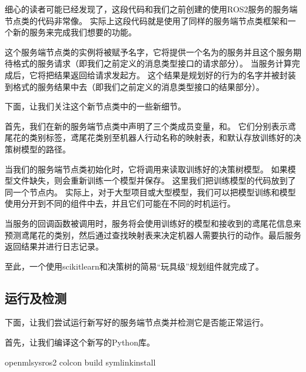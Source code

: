 \documentclass[letterpaper,10pt,english]{sphinxmanual}
\begin{document}
\sphinxAtStartPar
细心的读者可能已经发现了，这段代码和我们之前创建的使用ROS2服务的服务端节点类的代码非常像。
实际上这段代码就是使用了同样的服务端节点类框架和一个新的服务来完成我们想要的功能。

\sphinxAtStartPar
这个服务端节点类的实例将被赋予名字，它将提供一个名为的服务并且这个服务期待格式的服务请求（即我们之前定义的消息类型接口的请求部分）。
当服务计算完成后，它将把结果返回给请求发起方。
这个结果是规划好的行为的名字并被封装到格式的服务结果中去（即我们之前定义的消息类型接口的结果部分）。

\sphinxAtStartPar
下面，让我们关注这个新节点类中的一些新细节。

\sphinxAtStartPar
首先，我们在新的服务端节点类中声明了三个类成员变量，和。
它们分别表示鸢尾花的类别标签，鸢尾花类别至机器人行动名称的映射表，和默认存放训练好的决策树模型的路径。

\sphinxAtStartPar
当我们的服务端节点类初始化时，它将调用来读取训练好的决策树模型。
如果模型文件缺失，则会重新训练一个模型并保存。
这里我们把训练模型的代码放到了同一个节点内。
实际上，对于大型项目或大型模型，我们可以把模型训练和模型使用分开到不同的组件中去，并且它们可能在不同的时机运行。

\sphinxAtStartPar
当服务的回调函数被调用时，服务将会使用训练好的模型和接收到的鸢尾花信息来预测鸢尾花的类别，然后通过查找映射表来决定机器人需要执行的动作。最后服务返回结果并进行日志记录。

\sphinxAtStartPar
至此，一个使用scikit\sphinxhyphen{}learn和决策树的简易“玩具级”规划组件就完成了。


\subsection{运行及检测}
\label{\detokenize{chapter_rl_sys/planning_code_ex:id6}}
\sphinxAtStartPar
下面，让我们尝试运行新写好的服务端节点类并检测它是否能正常运行。

\sphinxAtStartPar
首先，让我们编译这个新写的Python库。

\begin{sphinxVerbatim}[commandchars=\\\{\}]
 openmlsys\PYGZhy{}ros2
colcon build \PYGZhy{}\PYGZhy{}symlink\PYGZhy{}install
\end{sphinxVerbatim}
\end{document}
